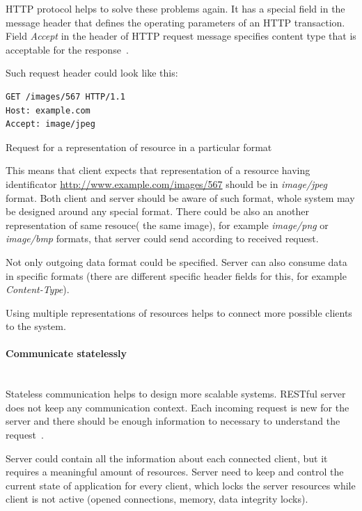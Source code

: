 HTTP protocol helps to solve these problems again. 
It has a special field in the message header that defines the operating parameters of an HTTP
transaction. Field \textit{Accept} in the header of HTTP request message
specifies content type that is acceptable for the response~\cite{http-rfc}.

Such request header could look like this:

\begin{listing}[H]
\begin{verbatim}
GET /images/567 HTTP/1.1
Host: example.com
Accept: image/jpeg
\end{verbatim}
\caption{Request for a representation of resource in a particular format}
\label{lst:http_accept_example}
\end{listing}

This means that client expects that representation of a resource having
identificator \url{http://www.example.com/images/567} should be in
\textit{image/jpeg} format. Both client and server should be aware of such
format, whole system may be designed around any special format. 
There could be also an another representation of same resouce( the same image),
for example \textit{image/png} or \textit{image/bmp} formats, that server could
send according to received request. 

Not only outgoing data format could be specified. Server can also consume data
in specific formats (there are different specific header fields for this, for
example \textit{Content-Type}).

Using multiple representations of resources helps to connect more possible
clients to the system.

\paragraph{Communicate statelessly} ~\\

Stateless communication helps to design more scalable systems.
RESTful server does not  keep any communication context. Each incoming  request
is new for the server and there should be enough information to necessary to
understand the request~\cite{Fielding2000}.

Server could contain all the information about each connected client, but it
requires a meaningful amount of resources. Server need to keep and control the
current state of application for every client, which locks the server resources
while client is not active (opened connections, memory, data integrity locks).

